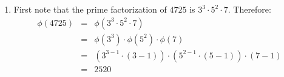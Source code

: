 \begin{enumerate}

\item First note that the prime factorization of $4725$ is $3^{3} \cdot 5^{2} \cdot 7$.
Therefore:
\begin{eqnarray*}
    \phi(4725) &=& \phi(3^{3} \cdot 5^{2} \cdot 7) \\
    &=& \phi(3^{3}) \cdot \phi(5^{2}) \cdot \phi(7) \\
    &=& (3^{3-1} \cdot (3 - 1)) \cdot (5^{2-1} \cdot (5 - 1)) \cdot (7 - 1) \\
    &=& 2520
\end{eqnarray*}

\end{enumerate}